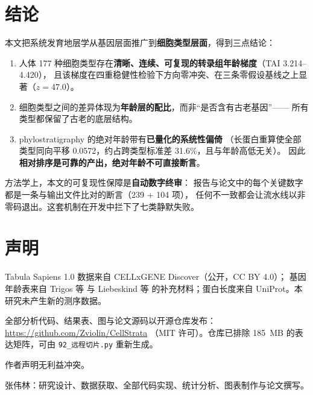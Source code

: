 \documentclass{cjc}
\newcommand{\tai}{\textrm{TAI}}
\newcommand{\code}[1]{\texttt{\small #1}}
\begin{document}
\section{结论}

本文把系统发育地层学从基因层面推广到\textbf{细胞类型层面}，得到三点结论：

\begin{enumerate}[label=(\arabic*)]
  \item 人体 177 种细胞类型存在\textbf{清晰、连续、可复现的转录组年龄梯度}（\tai{} 3.214--4.420），
        且该梯度在四重稳健性检验下方向零冲突、在三条零假设基线之上显著（$z = 47.0$）。
  \item 细胞类型之间的差异体现为\textbf{年龄层的配比}，而非“是否含有古老基因”——
        所有类型都保留了古老的底层结构。
  \item phylostratigraphy 的绝对年龄带有\textbf{已量化的系统性偏倚}
        （长蛋白重算使全部类型同向平移 0.0572，约占跨类型标准差 31.6\%，且与年龄高低无关）。
        因此\textbf{相对排序是可靠的产出，绝对年龄不可直接断言}。
\end{enumerate}

方法学上，本文的可复现性保障是\textbf{自动数字终审}：
报告与论文中的每个关键数字都是一条与输出文件比对的断言（239 $+$ 104 项），
任何不一致都会让流水线以非零码退出。这套机制在开发中拦下了七类静默失败。

\section*{声明}
Tabula Sapiens 1.0 数据来自 CELLxGENE Discover（公开，CC BY 4.0）\cite{tabulaspians2022}；
基因年龄表来自 Trigos 等\cite{trigos2017} 与 Liebeskind 等\cite{liebeskind2016}
的补充材料；蛋白长度来自 UniProt。本研究未产生新的测序数据。

\vspace{0.35em}
全部分析代码、结果表、图与论文源码以开源仓库发布：\url{https://github.com/Zviolin/CellStrata}
（MIT 许可）。仓库已排除 185~MB 的表达矩阵，可由 \code{92\_远程切片.py} 重新生成。

\vspace{0.35em}
作者声明无利益冲突。

\vspace{0.35em}
张伟林：研究设计、数据获取、全部代码实现、统计分析、图表制作与论文撰写。
\end{document}
